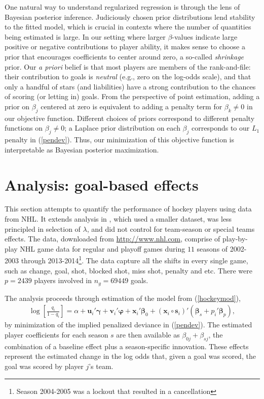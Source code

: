 One natural way to understand regularized regression is through the lens of
Bayesian posterior inference. Judiciously chosen prior distributions lend
stability to the fitted model, which is crucial in contexts where the number
of quantities being estimated is large. In our setting where larger
$\beta$-values indicate large positive or negative contributions to player
ability, it makes sense to choose a prior that encourages coefficients to
center around zero, a so-called {\em shrinkage} prior.  Our {\em a priori}
belief is that most players are members of the rank-and-file: their
contribution to goals is {\em neutral} (e.g., zero on the log-odds scale), and
that only a handful of stars (and liabilities) have a strong contribution to
the chances of scoring (or letting in) goals.  From the perspective of point
estimation, adding a prior on $\beta_j$ centered at zero is equivalent to
adding a penalty term for $\beta_k \ne 0$ in our objective function. Different
choices of priors correspond to different penalty functions on $\beta_j \ne
0$; a Laplace prior distribution on each $\beta_j$  corresponds to our $L_1$
penalty in (\ref{pendev}).  Thus, our minimization of this objective function
is interpretable as Bayesian posterior maximization.

\section{Analysis: goal-based effects}
\label{sec:goals}



This section attempts to quantify the performance of hockey players using data
from NHL. It extends  analysis in
\cite{gramacy:jensen:taddy:2013}, which used a smaller dataset, was less
principled in selection of $\lambda$, and did not control for team-season or
special teams effects. The data, downloaded from \url{http://www.nhl.com},
comprise of play-by-play NHL game data for regular and playoff games during
$11$ seasons of 2002-2003 through 2013-2014\footnote{Season 2004-2005 was a
lockout that resulted in a cancellation}. The data capture all the shifts in
every single game, such as change, goal, shot, blocked shot, miss shot,
penalty and etc. There were $p=2439$ players involved in $n_g=69449$ goals.


The analysis proceeds through estimation of the model from (\ref{hockeymod}),
\begin{align*}
\log\left[\frac{q_{i}}{1-q_{i}}\right] = \alpha + \mathbf{u}_i'\boldsymbol{\gamma} +
\mathbf{v}_i'\boldsymbol{\varphi} + \mathbf{x}_i'\boldsymbol{\beta}_0 +
(\mathbf{x}_i\circ\mathbf{s}_i)'(\boldsymbol{\beta}_s +
p_i'\boldsymbol{\beta}_{p}), \end{align*} by minimization of the implied
penalized deviance in (\ref{pendev}). The estimated player coefficients for
each season $s$ are then available as $\beta_{0j} + \beta_{sj}$,  the
combination of a  baseline effect plus a season-specific innovation.  These
effects represent the estimated change in the log odds that, given a goal was
scored, the goal was scored by player $j$'s team.


